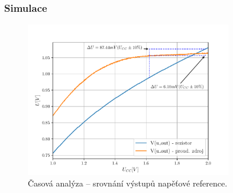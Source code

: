 \subsubsection{Simulace}

\begin{figure}[h!]
    \centering
    \includegraphics[width=0.8\textwidth]{img/3-2-3.pdf}
    \caption{Časová analýza -- srovnání výstupů napěťové reference.}
    \label{fig:img/3-2-3.pdf}
\end{figure}